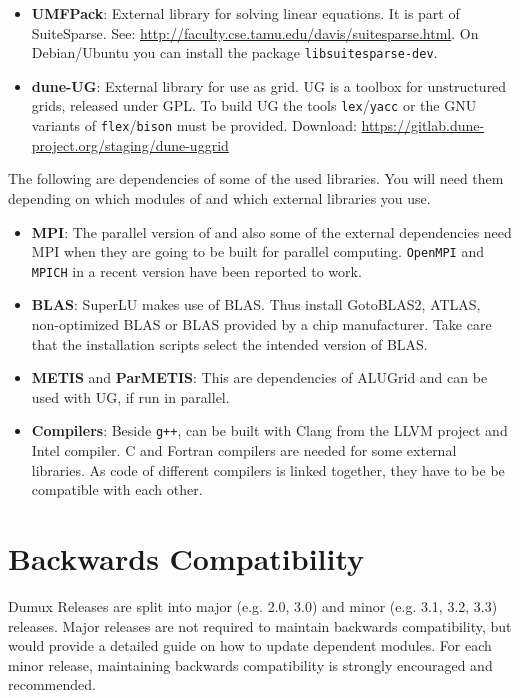 \begin{itemize}
\item \textbf{UMFPack}: External library for solving linear equations. It is part of SuiteSparse.
  See: \url{http://faculty.cse.tamu.edu/davis/suitesparse.html}. On Debian/Ubuntu you can install the package \texttt{libsuitesparse-dev}.

\item \textbf{dune-UG}: External library for use as grid. UG is a toolbox for unstructured grids, released under GPL.
  To build UG the tools \texttt{lex}/\texttt{yacc} or the GNU variants of \texttt{flex}/\texttt{bison} must be provided.
  Download: \url{https://gitlab.dune-project.org/staging/dune-uggrid}
\end{itemize}

The following are dependencies of some of the used libraries. You will need them
depending on which modules of \Dune and which external libraries you use.

\begin{itemize}
\item \textbf{MPI}: The parallel version of \Dune and also some of the external dependencies need MPI
  when they are going to be built for parallel computing. \texttt{OpenMPI} and \texttt{MPICH} in a recent
  version have been reported to work.

\item \textbf{BLAS}: SuperLU makes use of BLAS. Thus install GotoBLAS2, ATLAS, non-optimized BLAS
  or BLAS provided by a chip manufacturer. Take care that the installation scripts select the intended
  version of BLAS.

\item \textbf{METIS} and \textbf{ParMETIS}: This are dependencies of ALUGrid and can be used with UG, if run in parallel.

\item \textbf{Compilers}: Beside \texttt{g++}, \Dune can be built with Clang from the LLVM project and
  Intel \Cplusplus compiler. C and Fortran compilers are needed for some external libraries. As code of
  different compilers is linked together, they have to be be compatible with each other.
\end{itemize}

\section{Backwards Compatibility}
\label{sec:backwardscompatibility}

Dumux Releases are split into major (e.g. 2.0, 3.0) and minor (e.g. 3.1, 3.2, 3.3) releases.
Major releases are not required to maintain backwards compatibility, 
but would provide a detailed guide on how to update dependent modules.
For each minor release, maintaining backwards compatibility is strongly encouraged and recommended.

